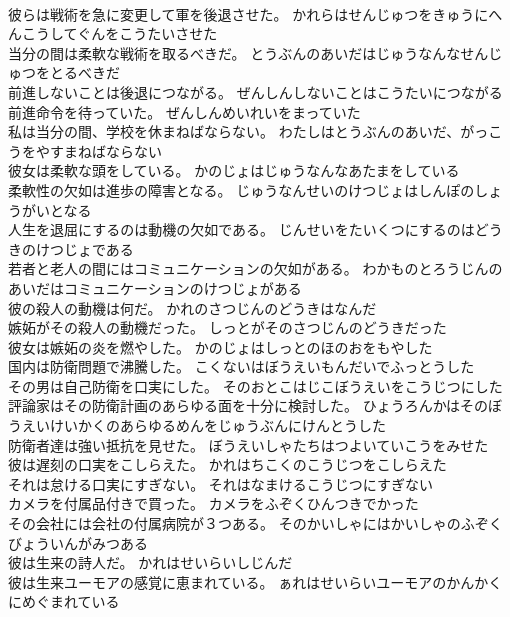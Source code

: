 \documentclass[8pt]{extreport}
\begin{document}
\begin{CJK}{UTF8}{min}
\\	彼らは戦術を急に変更して軍を後退させた。	かれらはせんじゅつをきゅうにへんこうしてぐんをこうたいさせた 
\\	当分の間は柔軟な戦術を取るべきだ。	とうぶんのあいだはじゅうなんなせんじゅつをとるべきだ 
\\	前進しないことは後退につながる。	ぜんしんしないことはこうたいにつながる 
\\	前進命令を待っていた。	ぜんしんめいれいをまっていた 
\\	私は当分の間、学校を休まねばならない。	わたしはとうぶんのあいだ、がっこうをやすまねばならない 
\\	彼女は柔軟な頭をしている。	かのじょはじゅうなんなあたまをしている 
\\	柔軟性の欠如は進歩の障害となる。	じゅうなんせいのけつじょはしんぽのしょうがいとなる 
\\	人生を退屈にするのは動機の欠如である。	じんせいをたいくつにするのはどうきのけつじょである 
\\	若者と老人の間にはコミュニケーションの欠如がある。	わかものとろうじんのあいだはコミュニケーションのけつじょがある 
\\	彼の殺人の動機は何だ。	かれのさつじんのどうきはなんだ 
\\	嫉妬がその殺人の動機だった。	しっとがそのさつじんのどうきだった 
\\	彼女は嫉妬の炎を燃やした。	かのじょはしっとのほのおをもやした 
\\	国内は防衛問題で沸騰した。	こくないはぼうえいもんだいでふっとうした 
\\	その男は自己防衛を口実にした。	そのおとこはじこぼうえいをこうじつにした 
\\	評論家はその防衛計画のあらゆる面を十分に検討した。	ひょうろんかはそのぼうえいけいかくのあらゆるめんをじゅうぶんにけんとうした 
\\	防衛者達は強い抵抗を見せた。	ぼうえいしゃたちはつよいていこうをみせた 
\\	彼は遅刻の口実をこしらえた。	かれはちこくのこうじつをこしらえた 
\\	それは怠ける口実にすぎない。	それはなまけるこうじつにすぎない 
\\	カメラを付属品付きで買った。	カメラをふぞくひんつきでかった 
\\	その会社には会社の付属病院が３つある。	そのかいしゃにはかいしゃのふぞくびょういんがみつある 
\\	彼は生来の詩人だ。	かれはせいらいしじんだ 
\\	彼は生来ユーモアの感覚に恵まれている。	ぁれはせいらいユーモアのかんかくにめぐまれている 

\end{CJK}
\end{document}
